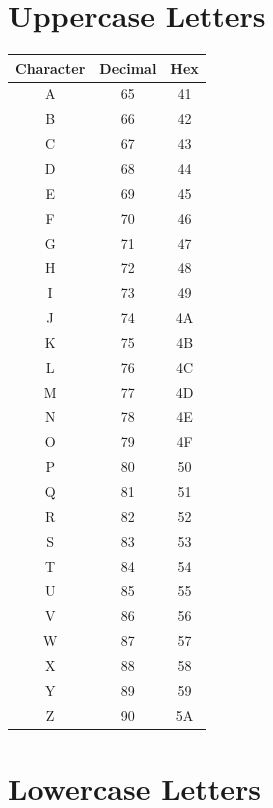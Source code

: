 \documentclass[12pt,openany]{book}
\begin{document}
\section{Uppercase Letters}

\begin{center}
\begin{tabular}{|c|c|c|}
\hline
Character & Decimal & Hex \\
\hline
A & 65 & 41 \\
B & 66 & 42 \\
C & 67 & 43 \\
D & 68 & 44 \\
E & 69 & 45 \\
F & 70 & 46 \\
G & 71 & 47 \\
H & 72 & 48 \\
I & 73 & 49 \\
J & 74 & 4A \\
K & 75 & 4B \\
L & 76 & 4C \\
M & 77 & 4D \\
N & 78 & 4E \\
O & 79 & 4F \\
P & 80 & 50 \\
Q & 81 & 51 \\
R & 82 & 52 \\
S & 83 & 53 \\
T & 84 & 54 \\
U & 85 & 55 \\
V & 86 & 56 \\
W & 87 & 57 \\
X & 88 & 58 \\
Y & 89 & 59 \\
Z & 90 & 5A \\
\hline
\end{tabular}
\end{center}

\section{Lowercase Letters}
\end{document}
